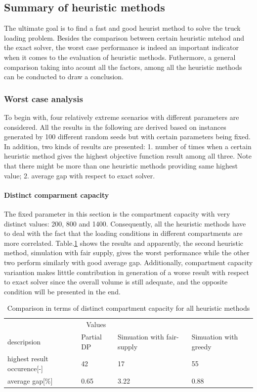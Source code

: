 \documentclass{article}
\begin{document}
\subsection{Summary of heuristic methods}
The ultimate goal is to find a fast and good heurist method to solve the truck loading problem. Besides the comparison between certain heuristic mtehod and the exact solver, the worst case performance is indeed an important indicator when it comes to the evaluation of heuristic methods. Futhermore, a general comparison taking into acount all the factors, among all the heuristic methods can be conducted to draw a conclusion.

\subsubsection{Worst case analysis}
To begin with, four relatively extreme scenarios with different parameters are considered. All the results in the following are derived based on instances generated by 100 different random seeds but with certain parameters being fixed. In addition, two kinds of results are presented: 1. number of times when a certain heuristic method gives the highest objective function result among all three. Note that there might be more than one heuristic methods providing same highest value; 2. average gap with respect to exact solver.

\paragraph{Distinct comparment capacity}
The fixed parameter in this section is the compartment capacity with very distinct values: 200, 800 and 1400. Consequently, all the heuristic methods have to deal with the fact that the loading conditions in different compartments are more correlated. Table.\ref{tab:distinct compartment capacity for heu} shows the results and apparently, the second heuristic method, simulation with fair supply, gives the worst performance while the other two perform similarly with good average gap. Additionally, compartment capacity variantion makes litttle comtribution in generation of a worse result with respect to exact solver since the overall volume is still adequate, and the opposite condition will be presented in the end.

\begin{table}[ht]
 \caption{Comparison in terms of distinct compartment capacity for all heuristic methods}
  \centering
  \begin{tabular}{llll}
    \toprule
    \multicolumn{3}{c}{Values}                   \\
    \cmidrule(r){2-3}
    descripsion   & Partial DP    & Simuation with fair-supply      & Simuation with greedy \\
    \midrule
    highest result occurence[-]	&	42 	&	17 	&	55 	\\
    average gap[\%]	&	0.65 	&	3.22 	&	0.88 	\\
    \bottomrule
  \end{tabular}
  \label{tab:distinct compartment capacity for heu}
\end{table}
\end{document}
